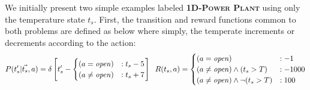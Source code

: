 \documentclass{article} %
\newcommand{\open}{\mathit{open}}
\begin{document}
We initially present two 
simple examples labeled \textsc{\bf 1D-Power Plant} 
using only the temperature state $t_s$.
First, the transition and reward functions common to both problems
are defined as below where simply, the temperate increments or
decrements according to the action:
{\footnotesize
\vspace{-1mm}
\begin{align}
\label{eq:trans}
P(t_s'|\vec{t_s},a)= \delta\left[ t_s' - 
\begin{cases}
 (a=\open) &: t_s - 5 \\ 
(a \neq \open) &: t_s + 7 \\
\end{cases}
\right]
\hspace{2mm}
R(t_s,a) = 
\begin{cases}
 (a=\open) &: -1 \\
(a \neq \open)\wedge (t_s>T) &: -1000 \\
(a \neq \open)\wedge \neg(t_s>T) &: 100 \\
\end{cases}
\end{align}
\vspace{-4mm}
}
\end{document}
